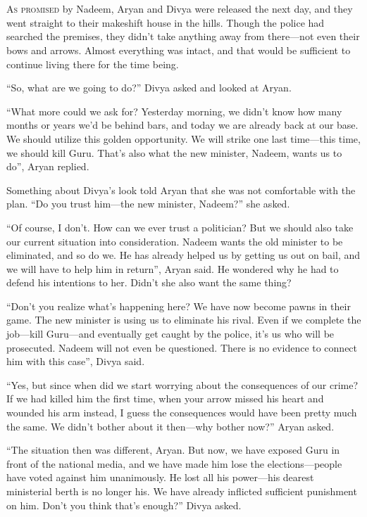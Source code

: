 \chapter{}

\lettrine{A}{s promised} by Nadeem, Aryan and Divya were released the next day,
and they went straight to their makeshift house in the hills. Though the police
had searched the premises, they didn't take anything away from there—not even
their bows and arrows. Almost everything was intact, and that would be sufficient
to continue living there for the time being.

“So, what are we going to do?” Divya asked and looked at Aryan.

“What more could we ask for? Yesterday morning, we didn't know how many months or
years we'd be behind bars, and today we are already back at our base. We
should utilize this golden opportunity. We will strike one last time—this time,
we should kill Guru. That's also what the new minister, Nadeem, wants us to do”,
Aryan replied.

Something about Divya's look told Aryan that she was not comfortable with the
plan. “Do you trust him—the new minister, Nadeem?” she asked.

“Of course, I don't. How can we ever trust a politician? But we should also take
our current situation into consideration. Nadeem wants the old minister to be
eliminated, and so do we. He has already helped us by getting us out on bail, and we
will have to help him in return”, Aryan said. He wondered why he had to defend his
intentions to her. Didn't she also want the same thing?

“Don't you realize what's happening here? We have now become pawns in their
game. The new minister is using us to eliminate his rival. Even if we complete
the job—kill Guru—and eventually get caught by the police, it's us who will
be prosecuted. Nadeem will not even be questioned. There is no evidence to
connect him with this case”, Divya said.

“Yes, but since when did we start worrying about the consequences of our crime?
If we had killed him the first time, when your arrow missed his heart and
wounded his arm instead, I guess the consequences would have been pretty much
the same. We didn't bother about it then—why bother now?” Aryan asked.

“The situation then was different, Aryan. But now, we have exposed Guru in front
of the national media, and we have made him lose the elections—people have voted
against him unanimously. He lost all his power—his dearest ministerial berth
is no longer his. We have already inflicted sufficient punishment on him. Don't
you think that's enough?” Divya asked.

